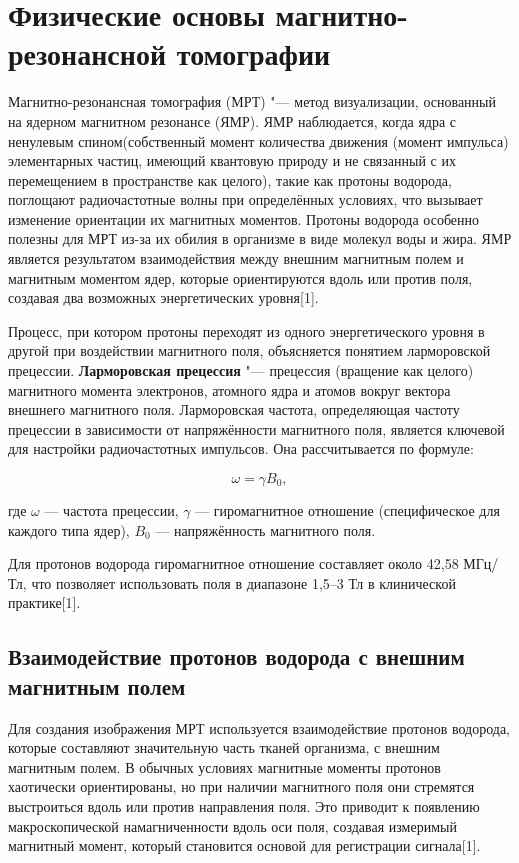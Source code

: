 \section{Физические основы магнитно-резонансной томографии}

Магнитно-резонансная томография (МРТ) "--- метод визуализации, основанный на ядерном магнитном резонансе (ЯМР). ЯМР наблюдается, когда ядра с ненулевым спином(собственный момент количества движения (момент импульса) элементарных частиц, имеющий квантовую природу и не связанный с их перемещением в пространстве как целого), такие как протоны водорода, поглощают радиочастотные волны при определённых условиях, что вызывает изменение ориентации их магнитных моментов. Протоны водорода особенно полезны для МРТ из-за их обилия в организме в виде молекул воды и жира. ЯМР является результатом взаимодействия между внешним магнитным полем и магнитным моментом ядер, которые ориентируются вдоль или против поля, создавая два возможных энергетических уровня[1].

Процесс, при котором протоны переходят из одного энергетического уровня в другой при воздействии магнитного поля, объясняется понятием ларморовской прецессии.
\textbf{Ларморовская прецессия} "--- прецессия (вращение как целого) магнитного момента электронов, атомного ядра и атомов вокруг вектора внешнего магнитного поля. Ларморовская частота, определяющая частоту прецессии в зависимости от напряжённости магнитного поля, является ключевой для настройки радиочастотных импульсов. Она рассчитывается по формуле:

\[
\omega = \gamma B_0,
\]

где \(\omega\) — частота прецессии, \(\gamma\) — гиромагнитное отношение (специфическое для каждого типа ядер), \(B_0\) — напряжённость магнитного поля. 

Для протонов водорода гиромагнитное отношение составляет около 42,58 МГц/Тл, что позволяет использовать поля в диапазоне 1,5–3 Тл в клинической практике[1].

\subsection{Взаимодействие протонов водорода с внешним магнитным полем}

Для создания изображения МРТ используется взаимодействие протонов водорода, которые составляют значительную часть тканей организма, с внешним магнитным полем. В обычных условиях магнитные моменты протонов хаотически ориентированы, но при наличии магнитного поля они стремятся выстроиться вдоль или против направления поля. Это приводит к появлению макроскопической намагниченности вдоль оси поля, создавая измеримый магнитный момент, который становится основой для регистрации сигнала[1].

